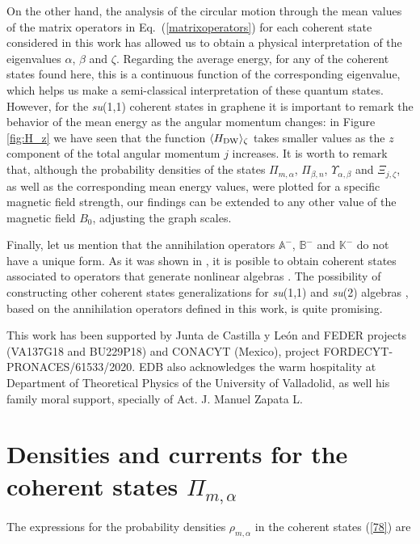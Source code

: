 \documentclass[aps,showpacs,showkeys]{revtex4}
\begin{document}
On the other hand, the analysis of the circular motion through the mean values of the matrix operators in Eq.~(\ref{matrixoperators}) for each coherent state considered in this work has allowed us to obtain a physical interpretation of the eigenvalues $\alpha$, $\beta$ and $\zeta$. Regarding the average energy, for any of the coherent states found here, this is a continuous function of the corresponding eigenvalue, which helps us make a semi-classical interpretation of these quantum states. However, for the {\it su}(1,1) coherent states in graphene it is important to remark the behavior of the mean energy as the angular momentum changes: in Figure \ref{fig:H_z} we have seen that the function $\langle H_{\rm DW}\rangle_\zeta$ takes smaller values as the $z$ component of the total angular momentum $j$ increases. It is worth to remark that, although the probability densities of the states $\Pi_{m,\alpha}$, $\Pi_{\beta,n}$, $\Upsilon_{\alpha,\beta}$ and $\Xi_{j,\zeta}$, as well as the corresponding mean energy values, were plotted for a specific magnetic field strength, our findings can be extended to any other value of the magnetic field $B_{0}$, adjusting the graph scales.

Finally, let us mention that the annihilation operators $\mathbb{A}^{-}$, $\mathbb{B}^-$ and $\mathbb{K}^-$ do not have a unique form. As it was shown in \cite{df17}, it is posible to obtain coherent states associated to operators that generate nonlinear algebras \cite{mmsz93,mmsz93a,hh02,rr00,rr00a,s00}. The possibility of constructing other coherent states generalizations for {\it su}(1,1) and {\it su}(2) algebras \cite{diaz20,f04,ng03,dhm12,dm13}, based on the annihilation operators defined in this work, is quite promising.



\acknowledgments

This work has been supported by Junta de Castilla y Le\'on and FEDER projects (VA137G18 and BU229P18) and CONACYT (Mexico), project FORDECYT-PRONACES/61533/2020. EDB also acknowledges the warm hospitality at Department of Theoretical Physics of the University of Valladolid, as well his family moral support, specially of Act. J. Manuel Zapata L.




\appendix

\section{Densities  and currents for the coherent states $\Pi_{m,\alpha}$}\label{Appendix}
The expressions for the probability densities $\rho_{m,\alpha}$ in the coherent states (\ref{78}) are 
\end{document}
